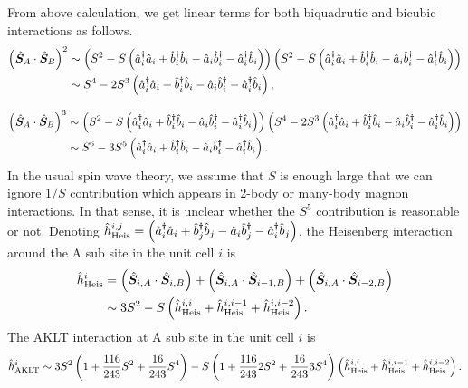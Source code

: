 \documentclass[11pt, aps, longbibliography]{article}
\begin{document}
From above calculation, we get linear terms for both biquadrutic and bicubic interactions as follows.
\begin{align}
    \left( \hat{\bm{S}}_A \cdot \hat{\bm{S}}_B \right)^2  &\sim \left(S^2 - S\left( \hat{a}^\dagger_i \hat{a}_i + \hat{b}^\dagger_i \hat{b}_i - \hat{a}_i \hat{b}^{\dagger}_i - \hat{a}^\dagger_i \hat{b}_i \right) \right)\left( S^2 - S\left( \hat{a}^\dagger_i \hat{a}_i + \hat{b}^\dagger_i \hat{b}_i - \hat{a}_i \hat{b}^{\dagger}_i - \hat{a}^\dagger_i \hat{b}_i \right) \right) \notag  \\
    &\sim S^4 - 2S^3 \left( \hat{a}^\dagger_i \hat{a}_i + \hat{b}^\dagger_i \hat{b}_i - \hat{a}_i \hat{b}^{\dagger}_i - \hat{a}^\dagger_i \hat{b}_i \right),
\end{align}

\begin{align}
    \left( \hat{\bm{S}}_A \cdot \hat{\bm{S}}_B \right)^3  &\sim \left(S^2 - S\left( \hat{a}^\dagger_i \hat{a}_i + \hat{b}^\dagger_i \hat{b}_i - \hat{a}_i \hat{b}^{\dagger}_i - \hat{a}^\dagger_i \hat{b}_i \right) \right)\left(S^4 - 2S^3 \left( \hat{a}^\dagger_i \hat{a}_i + \hat{b}^\dagger_i \hat{b}_i - \hat{a}_i \hat{b}^{\dagger}_i - \hat{a}^\dagger_i \hat{b}_i \right) \right) \notag \\
    &\sim S^6 - 3S^5 \left( \hat{a}^\dagger_i \hat{a}_i + \hat{b}^\dagger_i \hat{b}_i - \hat{a}_i \hat{b}^{\dagger}_i - \hat{a}^\dagger_i \hat{b}_i \right).
\end{align}
In the usual spin wave theory, we assume that $S$ is enough large that we can ignore $1/S$ contribution which appears in 2-body or many-body magnon interactions.
In that sense, it is unclear whether the $S^5$ contribution is reasonable or not.
Denoting $\hat{h}_{\rm Heis}^{i,j} = \left( \hat{a}^\dagger_i \hat{a}_i + \hat{b}^\dagger_j \hat{b}_j - \hat{a}_i \hat{b}^{\dagger}_j - \hat{a}^\dagger_i \hat{b}_j \right)$, the Heisenberg interaction around the A sub site in the unit cell $i$
is 
\begin{align}
    \hat{h}_{\rm Heis}^i &= \left( \hat{\bm{S}}_{i,A} \cdot \hat{\bm{S}}_{i,B} \right) + \left( \hat{\bm{S}}_{i,A} \cdot \hat{\bm{S}}_{i-1,B} \right) + \left( \hat{\bm{S}}_{i,A} \cdot \hat{\bm{S}}_{i-2,B} \right) \notag \\
    &\sim 3S^2 - S \left( \hat{h}_{\rm Heis}^{i,i} + \hat{h}_{\rm Heis}^{i,i-1} + \hat{h}_{\rm Heis}^{i,i-2} \right).
\end{align}
The AKLT interaction at A sub site in the unit cell $i$ is
\begin{equation}
    \hat{h}_{\rm AKLT}^{i} \sim 3S^2\left( 1+\frac{116}{243}S^2 + \frac{16}{243}S^4 \right) - S\left( 1+\frac{116}{243}2S^2 + \frac{16}{243}3S^4 \right)\left( \hat{h}_{\rm Heis}^{i,i} + \hat{h}_{\rm Heis}^{i,i-1} + \hat{h}_{\rm Heis}^{i,i-2} \right).
\end{equation}
\end{document}
